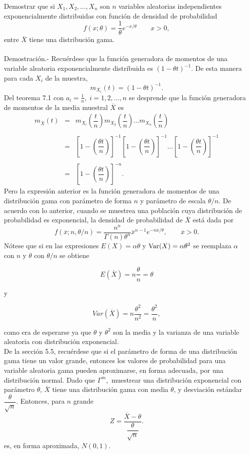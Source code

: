 \begin{ejem}

    Demostrar que si $X_1,X_2,\ldots,X_n$ son $n$ variables aleatorias independientes  exponencialmente distribuidas con función de densidad de probabilidad
    $$f(x;\theta)=\dfrac{1}{\theta}e^{-x/\theta}\qquad x>0,$$
    entre $\overline{X}$ tiene una distribución gama.\\\\
	Demostración.-\; Recuérdese que la función generadora de momentos de una variable aleatoria exponencialmente distribuida es $(1-\theta t)^{-1}$. De esta manera para cada $X_i$ de la muestra,
	$$m_{X_i}(t)=(1-\theta t)^{-1}.$$
	Del teorema 7.1 con $a_i=\frac{1}{n},\; i=1,2,\ldots , n$ se desprende que la función generadora de momentos de la media muestral $\overline{X}$ es 
	$$
	\begin{array}{rcl}
	    m_{\overline{X}}(t) &=& m_{X_i}\left(\dfrac{t}{n}\right)m_{X_2}\left(\dfrac{t}{n}\right)\ldots m_{X_n}\left(\dfrac{t}{n}\right)\\\\
				&=& \left[1-\left(\dfrac{\theta t}{n}\right)\right]^{-1}\left[1-\left(\dfrac{\theta t}{n}\right)\right]^{-1}\ldots \left[1-\left(\dfrac{\theta t}{n}\right)\right]^{-1}\\\\
				&=& \left[1-\left(\dfrac{\theta t}{n}\right)\right]^{-n}.
	\end{array}
	$$
	Pero la expresión anterior es la función generadora de momentos de una distribución gama con parámetro de forma $n$ y parámetro de escala $\theta/n$. De acuerdo con lo anterior, cuando se muestrea una población cuya distribución de probabilidad es exponencial, la densidad de probabilidad de $\overline{X}$ está dada por
	$$f(\overline{x};n,\theta/n)=\dfrac{n^n}{\Gamma (n) \theta^n}\overline{x}^{n-1}e^{-n\overline{x}/\theta},\qquad \overline{x}>0.$$
	Nótese que si en las expresiones $E(X)=\alpha\theta$ y $\mathop{\mbox{\normalfont Var}}\nolimits(X)=\alpha\theta^2$ se reemplaza $\alpha$ con $n$ y $\theta$ con $\theta/n$ se obtiene
	\begin{tcolorbox}
	    $$E(\overline{X})=n\dfrac{\theta}{n}=\theta$$
	\end{tcolorbox}
	y
	\begin{tcolorbox}
	    $$Var(\overline{X})=n\dfrac{\theta^2}{n^2}=\dfrac{\theta^2}{n},$$
	\end{tcolorbox}
	como era de esperarse ya que $\theta$ y $\theta^2$ son la media y la varianza de una variable aleatoria con distribución exponencial.\\

	De la sección 5.5, recuérdese que si el parámetro de forma de una distribución gama tiene un valor grande, entonces los valores de probabilidad para una variable aleatoria gama pueden aproximarse, en forma adecuada, por una distribución normal. Dado que $\Gamma^m,$ muestrear una distribución exponencial con parámetro $\theta$, $\overline{X}$ tiene una distribución gama con media $\theta$, y desviación estándar $\dfrac{\theta}{\sqrt{n}}$. Entonces, para $n$ grande
	$$Z=\dfrac{\overline{X}-\theta}{\dfrac{\theta}{\sqrt{n}}}.$$
	es, en forma aproximada, $N(0,1)$.
\end{ejem}


